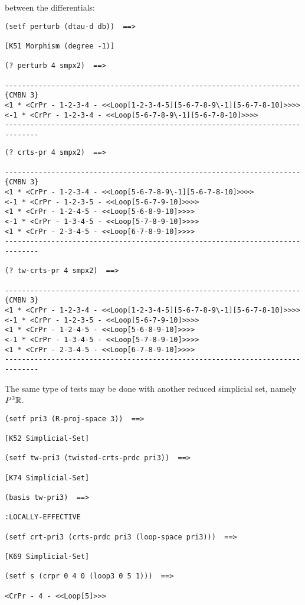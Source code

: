 between the differentials:
{\footnotesize\begin{verbatim}
(setf perturb (dtau-d db))  ==>

[K51 Morphism (degree -1)]

(? perturb 4 smpx2)  ==>

----------------------------------------------------------------------{CMBN 3}
<1 * <CrPr - 1-2-3-4 - <<Loop[1-2-3-4-5][5-6-7-8-9\-1][5-6-7-8-10]>>>>
<-1 * <CrPr - 1-2-3-4 - <<Loop[5-6-7-8-9\-1][5-6-7-8-10]>>>>
------------------------------------------------------------------------------
\end{verbatim}}
\newpage
{\footnotesize\begin{verbatim}
(? crts-pr 4 smpx2)  ==>

----------------------------------------------------------------------{CMBN 3}
<1 * <CrPr - 1-2-3-4 - <<Loop[5-6-7-8-9\-1][5-6-7-8-10]>>>>
<-1 * <CrPr - 1-2-3-5 - <<Loop[5-6-7-9-10]>>>>
<1 * <CrPr - 1-2-4-5 - <<Loop[5-6-8-9-10]>>>>
<-1 * <CrPr - 1-3-4-5 - <<Loop[5-7-8-9-10]>>>>
<1 * <CrPr - 2-3-4-5 - <<Loop[6-7-8-9-10]>>>>
------------------------------------------------------------------------------

(? tw-crts-pr 4 smpx2)  ==>

----------------------------------------------------------------------{CMBN 3}
<1 * <CrPr - 1-2-3-4 - <<Loop[1-2-3-4-5][5-6-7-8-9\-1][5-6-7-8-10]>>>>
<-1 * <CrPr - 1-2-3-5 - <<Loop[5-6-7-9-10]>>>>
<1 * <CrPr - 1-2-4-5 - <<Loop[5-6-8-9-10]>>>>
<-1 * <CrPr - 1-3-4-5 - <<Loop[5-7-8-9-10]>>>>
<1 * <CrPr - 2-3-4-5 - <<Loop[6-7-8-9-10]>>>>
------------------------------------------------------------------------------
\end{verbatim}}
The same type of tests may be done with another reduced simplicial set, namely $P^3{{\Bbb R}}$.
{\footnotesize\begin{verbatim}
(setf pri3 (R-proj-space 3))  ==>

[K52 Simplicial-Set]

(setf tw-pri3 (twisted-crts-prdc pri3))  ==>

[K74 Simplicial-Set]

(basis tw-pri3)  ==>

:LOCALLY-EFFECTIVE

(setf crt-pri3 (crts-prdc pri3 (loop-space pri3)))  ==>

[K69 Simplicial-Set]

(setf s (crpr 0 4 0 (loop3 0 5 1)))  ==>

<CrPr - 4 - <<Loop[5]>>>
\end{verbatim}}
